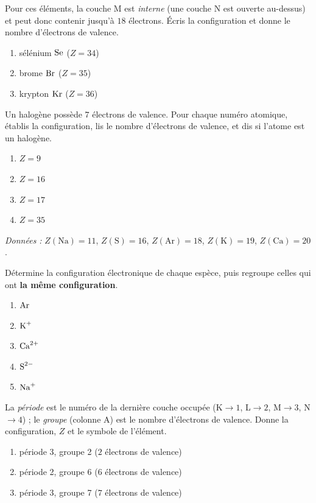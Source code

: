 \documentclass[11pt,a4paper]{article}
\begin{document}
\begin{exo}
Pour ces éléments, la couche M est \emph{interne} (une couche N est ouverte au-dessus) et peut donc
contenir jusqu'à $18$ électrons. Écris la configuration et donne le nombre d'électrons de valence.
\begin{enumerate}[label=\alph*)]
  \item sélénium $\ce{Se}$ ($Z = 34$)
  \item brome $\ce{Br}$ ($Z = 35$)
  \item krypton $\ce{Kr}$ ($Z = 36$)
\end{enumerate}
\end{exo}

\begin{exo}
Un halogène possède $7$ électrons de valence. Pour chaque numéro atomique, établis la configuration,
lis le nombre d'électrons de valence, et dis si l'atome est un halogène.
\begin{enumerate}[label=\alph*)]
  \item $Z = 9$
  \item $Z = 16$
  \item $Z = 17$
  \item $Z = 35$
\end{enumerate}
\end{exo}

\begin{exo}[isoélectronie]
\textit{Données :} $Z(\mathrm{Na})=11$, $Z(\mathrm{S})=16$, $Z(\mathrm{Ar})=18$, $Z(\mathrm{K})=19$,
$Z(\mathrm{Ca})=20$.

\smallskip
Détermine la configuration électronique de chaque espèce, puis regroupe celles qui ont \textbf{la même
configuration}.
\begin{enumerate}[label=\alph*)]
  \item $\ce{Ar}$
  \item $\ce{K^{+}}$
  \item $\ce{Ca^{2+}}$
  \item $\ce{S^{2-}}$
  \item $\ce{Na^{+}}$
\end{enumerate}
\end{exo}

\begin{exo}
La \emph{période} est le numéro de la dernière couche occupée (K$\to 1$, L$\to 2$, M$\to 3$, N$\to 4$) ;
le \emph{groupe} (colonne A) est le nombre d'électrons de valence. Donne la configuration, $Z$ et le
symbole de l'élément.
\begin{enumerate}[label=\alph*)]
  \item période 3, groupe 2 ($2$ électrons de valence)
  \item période 2, groupe 6 ($6$ électrons de valence)
  \item période 3, groupe 7 ($7$ électrons de valence)
\end{enumerate}
\end{exo}
\end{document}
